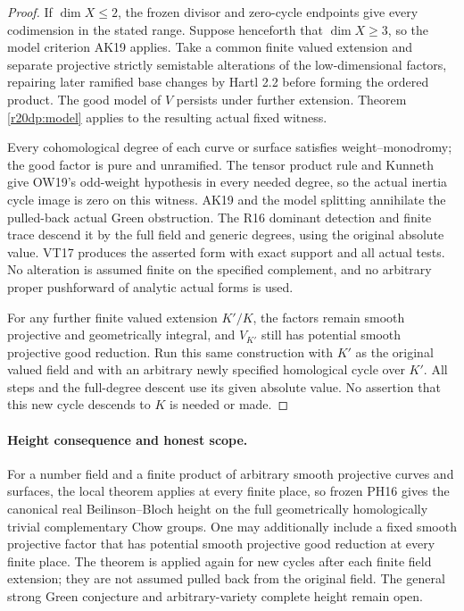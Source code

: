 \begin{proof}
If $\dim X\leq2$, the frozen divisor and zero-cycle endpoints
give every codimension in the stated range. Suppose henceforth
that $\dim X\geq3$, so the model criterion AK19 applies.
Take a common finite valued extension and separate projective
strictly semistable alterations of the low-dimensional factors,
repairing later ramified base changes by Hartl 2.2 before
forming the ordered product. The good model of $V$ persists
under further extension. Theorem \ref{r20dp:model} applies
to the resulting actual fixed witness.

Every cohomological degree of each curve or surface satisfies
weight--monodromy; the good factor is pure and unramified.
The tensor product rule and Kunneth give OW19's odd-weight
hypothesis in every needed degree, so the actual inertia
cycle image is zero on this witness. AK19 and the model
splitting annihilate the pulled-back actual Green obstruction.
The R16 dominant detection and finite trace descend it by
the full field and generic degrees, using the original
absolute value. VT17 produces the asserted form with exact
support and all actual tests. No alteration is assumed finite
on the specified complement, and no arbitrary proper
pushforward of analytic actual forms is used.

For any further finite valued extension $K'/K$, the factors
remain smooth projective and geometrically integral, and $V_{K'}$
still has potential smooth projective good reduction. Run this
same construction with $K'$ as the original valued field and
with an arbitrary newly specified homological cycle over $K'$.
All steps and the full-degree descent use its given absolute
value. No assertion that this new cycle descends to $K$ is
needed or made.
\end{proof}

\paragraph{Height consequence and honest scope.}
For a number field and a finite product of arbitrary smooth
projective curves and surfaces, the local theorem applies at
every finite place, so frozen PH16 gives the canonical real
Beilinson--Bloch height on the full geometrically homologically
trivial complementary Chow groups. One may additionally
include a fixed smooth projective factor that has potential
smooth projective good reduction at every finite place.
The theorem is applied again for new cycles after each finite
field extension; they are not assumed pulled back from the
original field. The general strong Green conjecture and
arbitrary-variety complete height remain open.

